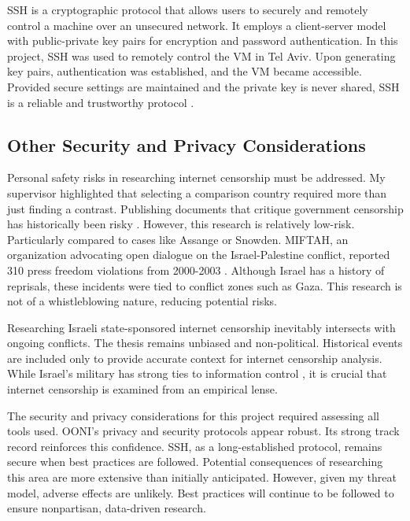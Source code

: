 SSH is a cryptographic protocol that allows users to securely and remotely control a machine over an unsecured network. It employs a client-server model with public-private key pairs for encryption and password authentication. In this project, SSH was used to remotely control the VM in Tel Aviv. Upon generating key pairs, authentication was established, and the VM became accessible. Provided secure settings are maintained and the private key is never shared, SSH is a reliable and trustworthy protocol \cite{SSHManual}.

\subsection{Other Security and Privacy Considerations}
Personal safety risks in researching internet censorship must be addressed. My supervisor highlighted that selecting a comparison country required more than just finding a contrast. Publishing documents that critique government censorship has historically been risky \cite{JulianAssange, EdwardSnowden}. However, this research is relatively low-risk. Particularly compared to cases like Assange or Snowden. MIFTAH, an organization advocating open dialogue on the Israel-Palestine conflict, reported 310 press freedom violations from 2000-2003 \cite{MIFTAHReport2003}. Although Israel has a history of reprisals, these incidents were tied to conflict zones such as Gaza. This research is not of a whistleblowing nature, reducing potential risks.

Researching Israeli state-sponsored internet censorship inevitably intersects with ongoing conflicts. The thesis remains unbiased and non-political. Historical events are included only to provide accurate context for internet censorship analysis. While Israel’s military has strong ties to information control \cite{IsraelCensorship}, it is crucial that internet censorship is examined from an empirical lense.

The security and privacy considerations for this project required assessing all tools used. OONI’s privacy and security protocols appear robust. Its strong track record reinforces this confidence. SSH, as a long-established protocol, remains secure when best practices are followed. Potential consequences of researching this area are more extensive than initially anticipated. However, given my threat model, adverse effects are unlikely. Best practices will continue to be followed to ensure nonpartisan, data-driven research.


